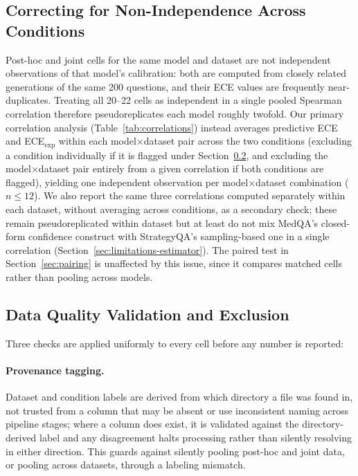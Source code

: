 \documentclass[letterpaper]{article} %
\begin{document}
\subsection{Correcting for Non-Independence Across Conditions} \label{sec:independence} Post-hoc and joint cells for the same model and dataset are not independent observations of that model's calibration: both are computed from closely related generations of the same 200 questions, and their ECE values are frequently near-duplicates. Treating all 20--22 cells as independent in a single pooled Spearman correlation therefore pseudoreplicates each model roughly twofold. Our primary correlation analysis (Table~\ref{tab:correlations}) instead averages predictive ECE and ECE$_{\text{exp}}$ within each model$\times$dataset pair across the two conditions (excluding a condition individually if it is flagged under Section~\ref{sec:exclusion}, and excluding the model$\times$dataset pair entirely from a given correlation if both conditions are flagged), yielding one independent observation per model$\times$dataset combination ($n{\leq}12$). We also report the same three correlations computed separately within each dataset, without averaging across conditions, as a secondary check; these remain pseudoreplicated within dataset but at least do not mix MedQA's closed-form confidence construct with StrategyQA's sampling-based one in a single correlation (Section~\ref{sec:limitations-estimator}). The paired test in Section~\ref{sec:pairing} is unaffected by this issue, since it compares matched cells rather than pooling across models. 

\subsection{Data Quality Validation and Exclusion} \label{sec:exclusion} Three checks are applied uniformly to every cell before any number is reported: \paragraph{Provenance tagging.} Dataset and condition labels are derived from which directory a file was found in, not trusted from a column that may be absent or use inconsistent naming across pipeline stages; where a column does exist, it is validated against the directory-derived label and any disagreement halts processing rather than silently resolving in either direction. This guards against silently pooling post-hoc and joint data, or pooling across datasets, through a labeling mismatch. 
\end{document}
